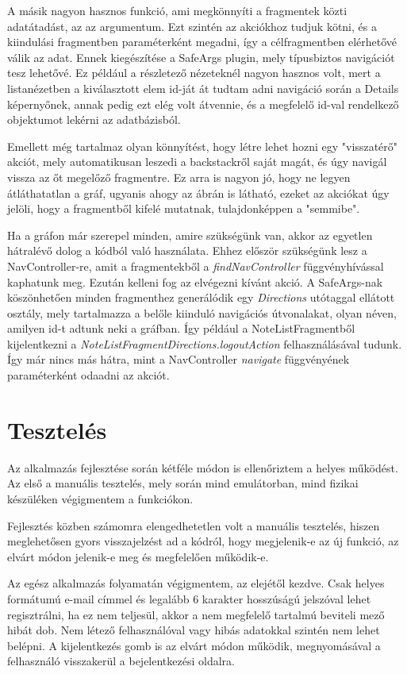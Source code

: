 A másik nagyon hasznos funkció, ami megkönnyíti a fragmentek közti adatátadást, az az argumentum. Ezt szintén az akciókhoz tudjuk kötni, és a kiindulási fragmentben paraméterként megadni, így a célfragmentben elérhetővé válik az adat. Ennek kiegészítése a SafeArgs plugin, mely típusbiztos navigációt tesz lehetővé. Ez például a részletező nézeteknél nagyon hasznos volt, mert a listanézetben a kiválasztott elem id-ját át tudtam adni navigáció során a Details képernyőnek, annak pedig ezt elég volt átvennie, és a megfelelő id-val rendelkező objektumot lekérni az adatbázisból. 

Emellett még tartalmaz olyan könnyítést, hogy létre lehet hozni egy "visszatérő" akciót, mely automatikusan leszedi a backstackről saját magát, és úgy navigál vissza az őt megelőző fragmentre. Ez arra is nagyon jó, hogy ne legyen átláthatatlan a gráf, ugyanis ahogy az ábrán is látható, ezeket az akciókat úgy jelöli, hogy a fragmentből kifelé mutatnak, tulajdonképpen a "semmibe".

Ha a gráfon már szerepel minden, amire szükségünk van, akkor az egyetlen hátralévő dolog a kódból való használata. Ehhez először szükségünk lesz a NavController-re, amit a fragmentekből a \emph{findNavController} függvényhívással kaphatunk meg. Ezután kelleni fog az elvégezni kívánt akció. A SafeArgs-nak köszönhetően minden fragmenthez generálódik egy \emph{Directions} utótaggal ellátott osztály, mely tartalmazza a belőle kiinduló navigációs útvonalakat, olyan néven, amilyen id-t adtunk neki a gráfban. Így például a NoteListFragmentből kijelentkezni a \emph{NoteListFragmentDirections.logoutAction} felhasználásával tudunk. Így már nincs más hátra, mint a NavController \emph{navigate} függvényének paraméterként odaadni az akciót.

\section{Tesztelés}
Az alkalmazás fejlesztése során kétféle módon is ellenőriztem a helyes működést. Az első a manuális tesztelés, mely során mind emulátorban, mind fizikai készüléken végigmentem a funkciókon.

Fejlesztés közben számomra elengedhetetlen volt a manuális tesztelés, hiszen meglehetősen gyors visszajelzést ad a kódról, hogy megjelenik-e az új funkció, az elvárt módon jelenik-e meg és megfelelően működik-e. 

Az egész alkalmazás folyamatán végigmentem, az elejétől kezdve. Csak helyes formátumú e-mail címmel és legalább 6 karakter hosszúságú jelszóval lehet regisztrálni, ha ez nem teljesül, akkor a nem megfelelő tartalmú beviteli mező hibát dob. Nem létező felhasználóval vagy hibás adatokkal szintén nem lehet belépni. A kijelentkezés gomb is az elvárt módon működik, megnyomásával a felhasználó visszakerül a bejelentkezési oldalra. 

